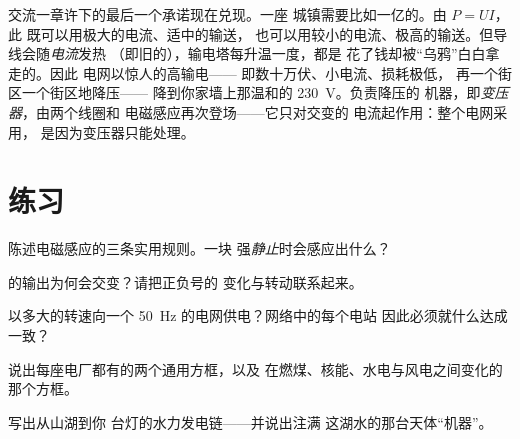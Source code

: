 \begin{remark}\label{rem:g9:alternator:transport}
交流一章许下的最后一个承诺现在兑现。一座
城镇需要比如一亿的。由 $P = U I$，此
既可以用极大的电流、适中的输送，
也可以用较小的电流、极高的输送。但导线会随\emph{电流}发热
（即旧的），输电塔每升温一度，都是
花了钱却被“乌鸦”白白拿走的。因此
电网以惊人的高输电——
即数十万伏、小电流、损耗极低，
再一个街区一个街区地降压——
降到你家墙上那温和的 \qty{230}{V}。负责降压的
机器，即\emph{变压器}，由两个线圈和
电磁感应再次登场——它只对交变的
电流起作用：整个电网采用，
是因为变压器只能处理。
\end{remark}

\section{练习}

\begin{exercise}[$\star$]\label{exo:g9:alternator:1}
陈述电磁感应的三条实用规则。一块
强\emph{静止}时会感应出什么？
\end{exercise}

\begin{exercise}[$\star$]\label{exo:g9:alternator:2}
的输出为何会交变？请把正负号的
变化与转动联系起来。
\end{exercise}

\begin{exercise}[$\star$]\label{exo:g9:alternator:3}
以多大的转速向一个
\qty{50}{Hz} 的电网供电？网络中的每个电站
因此必须就什么达成一致？
\end{exercise}

\begin{exercise}[$\star$]\label{exo:g9:alternator:4}
说出每座电厂都有的两个通用方框，以及
在燃煤、核能、水电与风电之间变化的那个方框。
\end{exercise}

\begin{exercise}[$\star$]\label{exo:g9:alternator:5}
写出从山湖到你
台灯的水力发电链——并说出注满
这湖水的那台天体“机器”。
\end{exercise}


